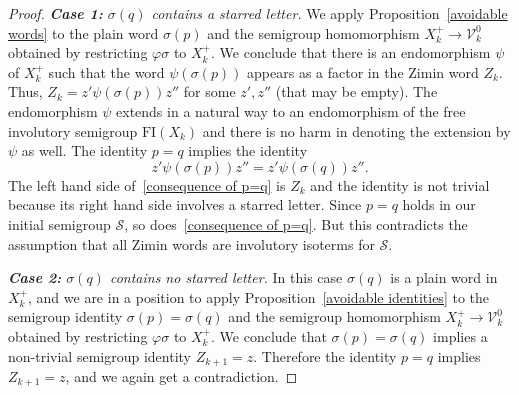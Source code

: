 \documentclass[11pt,reqno]{amsart}
\numberwithin{equation}{section}
\theoremstyle{remark}
\begin{document}
\begin{proof}
\emph{\textbf{Case 1:} $\sigma(q)$ contains a starred letter.} We
apply Proposition~\ref{avoidable words} to the plain word
$\sigma(p)$ and the semigroup homomorphism
$X_k^+\to\mathcal{V}_k^0$ obtained by restricting $\varphi\sigma$
to $X_k^+$. We conclude that there is an endomorphism $\psi$ of
$X_k^+$ such that the word $\psi(\sigma(p))$ appears as a factor
in the Zimin word $Z_k$. Thus, $Z_k=z'\psi(\sigma(p))z''$ for some
$z',z''$ (that may be empty). The endomorphism $\psi$ extends in a
natural way to an endomorphism of the free involutory semigroup
$\mathrm{FI}(X_k)$ and there is no harm in denoting the extension
by $\psi$ as well. The identity $p=q$ implies the identity
\begin{equation}
\label{consequence of p=q}
z'\psi(\sigma(p))z''=z'\psi(\sigma(q))z''.
\end{equation}
The left hand side of~\eqref{consequence of p=q} is $Z_k$ and the
identity is not trivial because its right hand side involves a
starred letter. Since $p=q$ holds in our initial semigroup
$\mathcal{S}$, so does~\eqref{consequence of p=q}. But this
contradicts the assumption that all Zimin words are involutory
isoterms for $\mathcal{S}$.

\emph{\textbf{Case 2:} $\sigma(q)$ contains no starred letter.} In
this case $\sigma(q)$ is a plain word in $X_k^+$, and we are in a
position to apply Proposition~\ref{avoidable identities} to the
semigroup identity $\sigma(p)=\sigma(q)$ and the semigroup
homomorphism $X_k^+\to\mathcal{V}_k^0$ obtained by restricting
$\varphi\sigma$ to $X_k^+$. We conclude that $\sigma(p)=\sigma(q)$
implies a non-trivial semigroup identity $Z_{k+1}=z$. Therefore
the identity $p=q$ implies $Z_{k+1}=z$, and we again get a
contradiction.
\end{proof}
\end{document}
